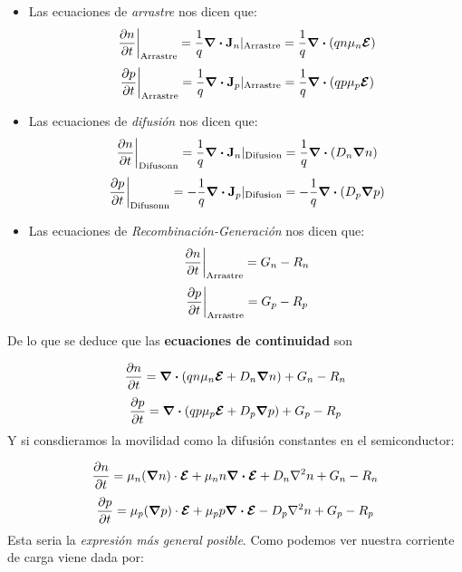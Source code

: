\begin{itemize}
	\item Las ecuaciones de \textit{arrastre} nos dicen que:
	\begin{equation}
		\eval{\parciales{n}{t}}_{\text{Arrastre}} = \frac{1}{q} \div  \Jn_n |_{\text{Arrastre}} = \frac{1}{q} \div \parentesis{qn\mu_n \Encal}
	\end{equation}
	\begin{equation}
		\eval{\parciales{p}{t}}_{\text{Arrastre}} = \frac{1}{q} \div  \Jn_p|_{\text{Arrastre}} = \frac{1}{q} \div \parentesis{qp\mu_p \Encal}
	\end{equation}
	\item Las ecuaciones de \textit{difusión} nos dicen que:
	\begin{equation}
		\eval{\parciales{n}{t}}_{\text{Difusonn}} = \frac{1}{q} \div  \Jn_n|_{\text{Difusion}} = \frac{1}{q} \div \parentesis{D_n \grad n}
	\end{equation}
	\begin{equation}
		\eval{\parciales{p}{t}}_{\text{Difusonn}} = - \frac{1}{q} \div  \Jn_p|_{\text{Difusion}} = - \frac{1}{q} \div \parentesis{D_p\grad p}
	\end{equation}
	\item Las ecuaciones de \textit{Recombinación-Generación} nos dicen que:
	\begin{equation}
		\eval{\parciales{n}{t}}_{\text{Arrastre}} = G_n - R_n
	\end{equation}
	\begin{equation}
		\eval{\parciales{p}{t}}_{\text{Arrastre}} = G_p - R_p
	\end{equation}
\end{itemize}
De lo que se deduce que las \textbf{ecuaciones de continuidad} son

\begin{equation}
	\frac{\partial n}{\partial t}=\div \left( qn\mu_n \boldsymbol{\mathcal{E}} +  D_n \grad n   \right) + G_n - R_n
\end{equation}
\begin{equation}
	\frac{\partial p}{\partial t} = \div \left( qp\mu_p \boldsymbol{\mathcal{E}} +  D_p \grad p   \right) + G_p - R_p
\end{equation}
Y si consdieramos la movilidad como la difusión constantes en el semiconductor:

\begin{equation}
	\frac{\partial n}{\partial t} = \mu_n (\grad n) \cdot \boldsymbol{\mathcal{E}} + \mu_n n \div \boldsymbol{\mathcal{E}} + D_n \nabla^2 n + G_n - R_n
\end{equation}
\begin{equation}
	\frac{\partial p}{\partial t} = \mu_p (\grad p) \cdot \boldsymbol{\mathcal{E}} + \mu_p p \div \boldsymbol{\mathcal{E}} - D_p \nabla^2 n + G_p - R_p
\end{equation}
Esta seria la \textit{expresión más general posible}. Como podemos ver nuestra corriente de carga viene dada por:

